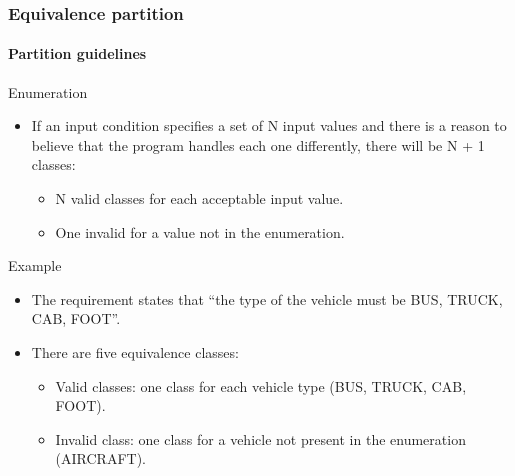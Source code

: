 \begin{frame}
\frametitle{Equivalence partition}
\framesubtitle{Partition guidelines}

\begin{block:fact}{Enumeration}
\begin{itemize}
	\item If an input condition specifies a set of N input values and there is
	a reason to believe that the program handles each one differently, there
	will be N + 1 classes:
	\begin{itemize}
		\item N valid classes for each acceptable input value.
		\item One invalid for a value not in the enumeration.
	\end{itemize}
\end{itemize}
\end{block:fact}

\begin{block}{Example}
\begin{itemize}
	\item The requirement states that ``the type of the vehicle must be BUS,
	TRUCK, CAB, FOOT''.

	\item There are five equivalence classes:
	\begin{itemize}
		\item Valid classes: one class for each vehicle type (BUS, TRUCK,
		CAB, FOOT).
		\item Invalid class: one class for a vehicle not present in the
		enumeration (AIRCRAFT).
	\end{itemize}
\end{itemize}
\end{block}
\end{frame}



